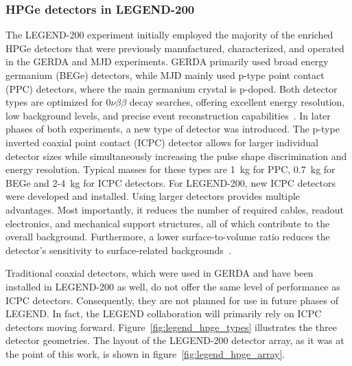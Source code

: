 \subsubsection{HPGe detectors in LEGEND-200}
\label{sec:HPGe_legend}
The LEGEND-200 experiment initially employed the majority of the enriched HPGe detectors that were previously manufactured, characterized, and operated in the GERDA and MJD experiments. GERDA primarily used broad energy germanium (BEGe) detectors, while MJD mainly used p-type point contact (PPC) detectors, where the main germanium crystal is p-doped. Both detector types are optimized for $0 \nu \beta \beta$ decay searches, offering excellent energy resolution, low background levels, and precise event reconstruction capabilities~\cite{collaboration_legend-1000_2021}. 
In later phases of both experiments, a new type of detector was introduced. The p-type inverted coaxial point contact (ICPC) detector allows for larger individual detector sizes while simultaneously increasing the pulse shape discrimination and energy resolution. Typical masses for these types are 1~kg for PPC, 0.7~kg for BEGe and 2-4~kg for ICPC detectors. 
For LEGEND-200, new ICPC detectors were developed and installed. Using larger detectors provides multiple advantages. Most importantly, it reduces the number of required cables, readout electronics, and mechanical support structures, all of which contribute to the overall background. 
Furthermore, a lower surface-to-volume ratio reduces the detector's sensitivity to surface-related backgrounds~\cite{collaboration_legend-1000_2021}. 

Traditional coaxial detectors, which were used in GERDA and have been installed in LEGEND-200 as well, do not offer the same level of performance as ICPC detectors. Consequently, they are not planned for use in future phases of LEGEND. In fact, the LEGEND collaboration will primarily rely on ICPC detectors moving forward. 
Figure~\ref{fig:legend_hpge_types} illustrates the three detector geometries. The layout of the LEGEND-200 detector array, as it was at the point of this work, is shown in figure~\ref{fig:legend_hpge_array}. 


